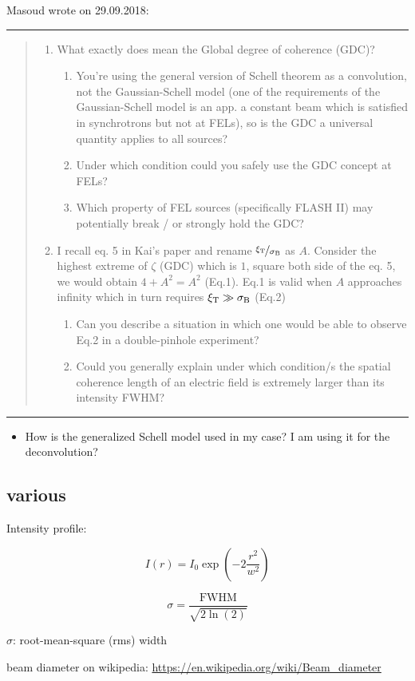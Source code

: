 \documentclass{article}
\newcommand{\mathup}[1]{\text{\textup{#1}}}
\newenvironment{itquote}
{\begin{quote}\itshape}
	{\end{quote}}
\begin{document}
Masoud wrote on 29.09.2018:

\noindent\rule{\textwidth}{1pt}
\begin{itquote}
	\begin{enumerate}
		\item What exactly does mean the Global degree of coherence (GDC)? 
		\begin{enumerate}
			\item You're using the general version of Schell theorem as a convolution, not the Gaussian-Schell model (one of the requirements of the Gaussian-Schell model is an app. a constant beam which is satisfied in synchrotrons but not at FELs), so is the GDC a universal quantity applies to all sources? 
			\item Under which condition could you safely use the GDC concept at FELs? 
			\item Which property of FEL sources (specifically FLASH II) may potentially break / or strongly hold the GDC?
		\end{enumerate}
		
		\item I recall eq. 5 in Kai's paper and rename $\nicefrac{\xi_\mathup{T}}{\sigma_\mathup{B}}$ as $A$. Consider the highest extreme of $\zeta$ (GDC) which is $1$, square both side of the eq. 5, we would obtain $4+A^2 = A^2$ (Eq.1).
		Eq.1 is valid when $A$ approaches infinity which in turn requires $ \xi_\mathup{T} \gg \sigma_\mathup{B} $ (Eq.2) 
		\begin{enumerate}
			\item Can you describe a situation in which one would be able to observe Eq.2 in a double-pinhole experiment?
			\item Could you generally explain under which condition/s the spatial coherence length of an electric field is extremely larger than its intensity FWHM?
		\end{enumerate}
	\end{enumerate}
\end{itquote}
\noindent\rule{\textwidth}{1pt}

\begin{itemize}
	\item How is the generalized Schell model used in my case? I am using it for the deconvolution?
\end{itemize}

\subsection{various}

Intensity profile:

\[  I(r)=I_{0} \exp \left(-2{\frac {r^{2}}{w^{2}}}\right)  \]

\[ \sigma = \frac{\mathrm{FWHM}}{\sqrt{2 \ln(2)}} \]

$ \sigma $: root-mean-square (rms) width

beam diameter on wikipedia: \url{https://en.wikipedia.org/wiki/Beam_diameter}




\printbibliography
\end{document}
